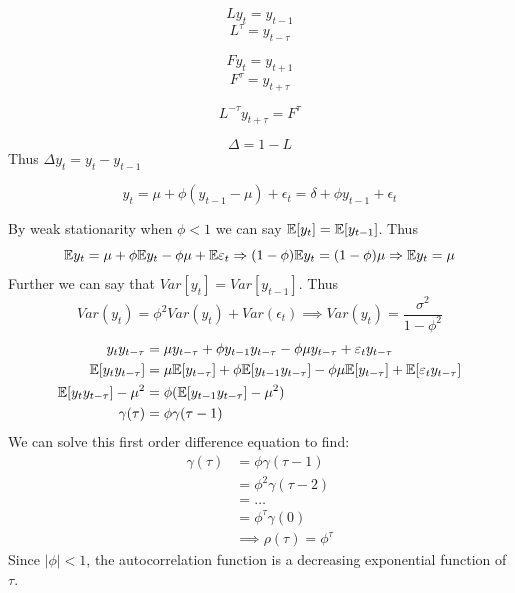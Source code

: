 \documentclass[DIV=14,titlepage=false]{scrreprt}
\begin{document}
\begin{definition}
    \[ Ly_t = y_{t-1} \]
    \[ L^{\tau} = y_{t-\tau} \]
\end{definition}
\begin{definition}
    \[ F y_t = y_{t+1} \]
    \[ F^{\tau} = y_{t+\tau} \]
\end{definition}
\[ L^{-\tau}y_{t+\tau} = F^{\tau} \]
\begin{definition}
    \[ \Delta = 1-L \]
    Thus $\Delta y_t = y_t - y_{t-1}$
\end{definition}
\begin{definition}[AR(1) Process]
    \[ y_t = \mu + \phi (y_{t-1}-\mu) + \epsilon_t = \delta + \phi y_{t-1} + \epsilon_t \]    
\end{definition}
By weak stationarity when $\phi <1$ we can say $\mathbb{E} [y_t] = \mathbb{E} [y_{t-1}]$. Thus
\[
    \mathbb{E} y_t = \mu + \phi \mathbb{E} y_t - \phi \mu + \mathbb{E} \varepsilon_t \Rightarrow (1-\phi) \mathbb{E} y_t = (1-\phi) \mu \Rightarrow \mathbb{E} y_t = \mu
\]
Further we can say that $Var[y_t] = Var[y_{t-1}]$. Thus
\[
    Var(y_t) = \phi^2 Var(y_t) + Var(\epsilon_t) \implies Var(y_t) = \frac{\sigma^2}{1-\phi^2}
\]
\begin{align*} 
    y_t y_{t-\tau} &= \mu y_{t-\tau} + \phi y_{t-1}y_{t-\tau} - \phi \mu y_{t-\tau} + \varepsilon_t y_{t-\tau} \\
    \mathbb{E}[y_t y_{t-\tau}] &= \mu \mathbb{E}[y_{t-\tau}] + \phi \mathbb{E}[y_{t-1}y_{t-\tau}] - \phi \mu \mathbb{E}[y_{t-\tau}] + \mathbb{E}[\varepsilon_t y_{t-\tau}] \\
    \mathbb{E}[y_t y_{t-\tau}] - \mu^2 &= \phi ( \mathbb{E} [y_{t-1}y_{t-\tau}] - \mu^2 )\\
    \gamma(\tau) &= \phi \gamma(\tau-1)
\end{align*}
We can solve this first order difference equation to find:
\begin{align*}
    \gamma(\tau) &= \phi \gamma(\tau-1) \\
    &= \phi^2 \gamma(\tau-2) \\
    &= \dots \\
    &= \phi^{\tau} \gamma(0) \\
    &\implies \rho(\tau) = \phi^{\tau}
\end{align*}
Since $|\phi| < 1$, the autocorrelation function is a decreasing exponential function of $\tau$. 
\\
\end{document}
